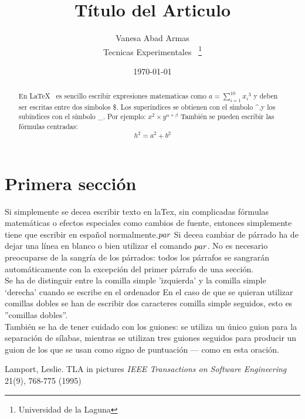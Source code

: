 \documentclass[a4paper,12pt]{article}
\begin{document}
\title{Título del Articulo}
\author{Vanesa Abad Armas\\
	Tecnicas Experimentales ~\footnote{Universidad de la Laguna}
	}
\date{\today}
\maketitle
\begin{abstract}
   En \LaTeX{}~\cite{Lam:86} es sencillo escribir expresiones
matematicas como $a=\sum_{i=1}^{10}{x_i}^{3} $
y deben ser escritas entre dos símbolos \$.
Los superíndices se obtienen con el símbolo \^{},y
los subíndices con el símbolo \_.
Por ejemplo: $x^2 \times y^{\alpha + \beta}$
También se pueden escribir las fórmulas centradas:
\[h^2=a^2 + b^2\]
\end{abstract}
\section{Primera sección}

Si simplemente se decea escribir texto en laTex,
sin complicadas f\'ormulas matem\'aticas o efectos especiales
como cambios de fuente, entonces simplemente tiene que escribir
en español normalmente.$\\par$
Si decea cambiar de párrado ha de dejar una línea en blanco o bien
utilizar el comando $\\par$.
No es necesario preocuparse de la sangría de los párrados:
todos los párrafos se sangrarán automáticamente con la excepción
del primer párrafo de una sección.\\
Se ha de distinguir entre la comilla simple 'izquierda'
y la comilla simple `derecha' cuando se escribe en el ordenador
En el caso de que se quieran utilizar comillas dobles se han de
escribir dos caracteres comilla simple seguidos, esto es
''comillas dobles''.\\
También se ha de tener cuidado con los guiones: se utiliza un único
guion para la separación de sílabas, mientras se utilizan
tres guiones seguidos para producir un guion de los que se usan 
como signo de puntuación --- como en esta oración. 
\begin{thebibliography}{00}
    Lamport, Leslie.
    TLA in pictures
    \emph{IEEE Transactions on Software Engineering}
    21(9), 768-775
    (1995)
\end{thebibliography}
\end{document}
